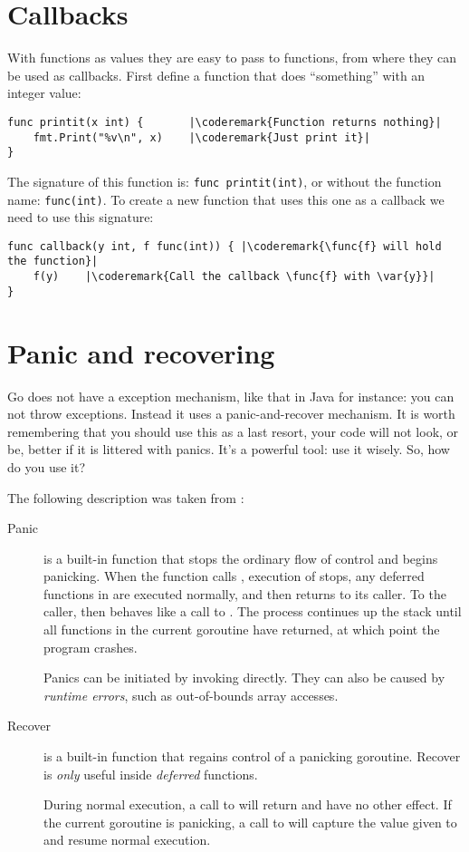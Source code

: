 \section{Callbacks}
\label{sec:callbacks}
With functions as values they are easy to pass to functions, from where
they can be used as callbacks. First define a function that
does ``something'' with an integer value:
\begin{lstlisting}
func printit(x int) {       |\coderemark{Function returns nothing}|
    fmt.Print("%v\n", x)    |\coderemark{Just print it}|
}
\end{lstlisting}
The signature of this function is: \lstinline{func printit(int)}, or
without the function name: \mbox{\lstinline{func(int)}}. To create a new function
that uses this one as a callback we need to use this signature:
\begin{lstlisting}
func callback(y int, f func(int)) { |\coderemark{\func{f} will hold the function}|
    f(y)    |\coderemark{Call the callback \func{f} with \var{y}}|
}
\end{lstlisting}

\section{Panic and recovering}
\label{sec:panic}
Go does not have a exception mechanism, like that in Java for instance: you can not throw exceptions.
Instead it uses a panic-and-recover mechanism. It is worth remembering that you should use this as
a last resort, your code will not look, or be, better if it is littered with panics. It's a powerful tool:
use it wisely. So, how do you use it?

The following description was taken from \cite{go_blog_panic}:
\begin{description}
\item[Panic]{is a built-in function that stops the ordinary flow of control and begins panicking. When the function 
 calls ,
execution of  stops, any deferred functions in  are executed normally, and 
then  returns to its caller. To the caller,  then
behaves like a call to . The process continues up the stack until all functions in the current 
goroutine have returned, at which point the program crashes. 

Panics can be initiated by invoking  directly. They can also be caused by \emph{runtime errors}, such
as out-of-bounds array accesses.}

\item[Recover]{is a built-in function that regains control of a panicking goroutine. Recover is \emph{only} useful inside 
\emph{deferred} functions.

During normal execution, a call to  will return  and have no other effect. 
If the current goroutine is panicking, a call
to  will capture the value given to  and resume normal execution.}
\end{description}


